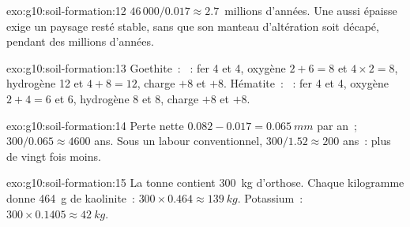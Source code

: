 \begin{solution}{exo:g10:soil-formation:12}
$46\,000/0.017 \approx 2.7$~millions d'années. Une  aussi épaisse
exige un paysage resté stable, sans que son manteau d'altération soit
décapé, pendant des millions d'années.
\end{solution}

\begin{solution}{exo:g10:soil-formation:13}
Goethite~: ~: fer 4 et 4,
oxygène $2 + 6 = 8$ et $4 \times 2 = 8$, hydrogène 12 et $4 + 8 = 12$, charge
$+8$ et $+8$. Hématite~: ~: fer 4
et 4, oxygène $2 + 4 = 6$ et 6, hydrogène 8 et 8, charge $+8$ et $+8$.
\end{solution}

\begin{solution}{exo:g10:soil-formation:14}
Perte nette $0.082 - 0.017 = \qty{0.065}{mm}$ par an~; $300/0.065 \approx 4600$
ans. Sous un labour conventionnel, $300/1.52 \approx 200$ ans~: plus de
vingt fois moins.
\end{solution}

\begin{solution}{exo:g10:soil-formation:15}
La tonne contient \qty{300}{kg} d'orthose. Chaque kilogramme donne
\qty{464}{g} de kaolinite~: $300 \times 0.464 \approx \qty{139}{kg}$. Potassium~:
$300 \times 0.1405 \approx \qty{42}{kg}$.
\end{solution}

